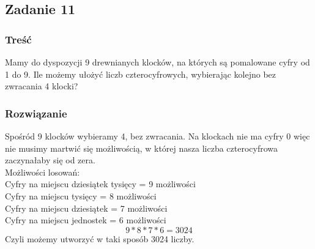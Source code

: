 \subsection{Zadanie 11}

\subsubsection*{Treść}
Mamy do dyspozycji 9 drewnianych klocków, na których są pomalowane cyfry od 1 do 9. Ile możemy 
ułożyć liczb czterocyfrowych, wybierając kolejno bez zwracania 4 klocki?


\subsubsection*{Rozwiązanie}
Spośród 9 klocków wybieramy 4, bez zwracania. Na klockach nie ma cyfry 0
więc nie musimy martwić się możliwością, w której nasza liczba czterocyfrowa
zaczynałaby się od zera.\\

Możliwości losowań:\\
Cyfry na miejscu dziesiątek tysięcy = 9 możliwości\\
Cyfry na miejscu tysięcy = 8 możliwości\\
Cyfry na miejscu dziesiątek = 7 możliwości\\
Cyfry na miejscu jednostek = 6 możliwości
$$
9*8*7*6 = 3024
$$
Czyli możemy utworzyć w taki sposób 3024 liczby.

